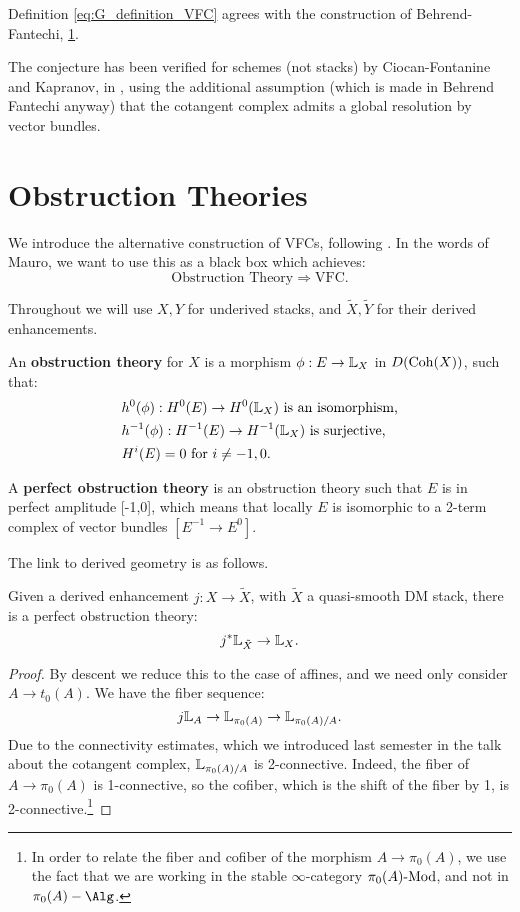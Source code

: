 \begin{conj}
Definition \ref{eq:G_definition_VFC} agrees with the construction of Behrend-Fantechi, \ref{}. 
\end{conj}

The conjecture has been verified for schemes (not stacks) by Ciocan-Fontanine and Kapranov, in
\cite{ciocan_fontanine_kapranov}, using the additional 
assumption (which is made in Behrend Fantechi anyway) that the cotangent complex admits a global resolution by vector bundles.




\section{Obstruction Theories}
We introduce the alternative construction of VFCs, following \cite{Behrend_Intrinsic_normal_cone_1997}. In the words of
Mauro, we want to use this as a black box which achieves:
\[	\text{Obstruction Theory} \Longrightarrow \text{VFC}.	\]

Throughout we will use $X,Y$ for underived stacks, and $\tilde X, \tilde Y$ for their derived enhancements.

\begin{defin}
An \textbf{obstruction theory} for $X$ is a morphism $\phi : E \to \mathbb L_X$ in $D(\mathrm{Coh}(X))$, such that:
\begin{align*}
&h^0(\phi) : H^0(E) \to H^0(\mathbb L_X) \text{ is an isomorphism,} \\
&h^{-1}(\phi) : H^{-1}(E) \to H^{-1}(\mathbb L_X) \text{ is surjective,} \\
&H^i(E) = 0 \text{ for } i \neq -1,0.
\end{align*} 
\end{defin}

\begin{defin}
A \textbf{perfect obstruction theory} is an obstruction theory such that $E$ is in perfect amplitude [-1,0], which means that
locally $E$ is isomorphic to a 2-term complex of vector bundles $[E^{-1} \to E^0]$.
\end{defin}

The link to derived geometry is as follows. 
\begin{prop}
Given a derived enhancement $j:X \to \tilde X$, with $\tilde X$ a quasi-smooth DM stack, there is a perfect obstruction theory:
\[	j^* \mathbb L_{\tilde X} \to \mathbb L_X.	\]
\end{prop}
\begin{proof}
By descent we reduce this to the case of affines, and we need only consider $A \to t_0(A)$. We have the fiber sequence:
\[	j\mathbb L_A \to \mathbb L_{\pi_0(A)} \to \mathbb L_{\pi_0(A)/A}.	\]
Due to the connectivity estimates, which we introduced last semester in the talk about the cotangent complex,
$\mathbb L_{\pi_0(A)/A}$ is 2-connective. Indeed, the fiber of $A \to \pi_0(A)$ is 1-connective,
so the cofiber, which is the shift of the fiber by 1, is 2-connective.\footnote{In order to relate the fiber and cofiber of the
morphism $A \to \pi_0(A)$, we use the fact that we are working in the stable $\infty$-category $\pi_0(A)\textrm{-}\mathrm{Mod}$, and not 
in $\pi_0(A)-\Alg$.}
\end{proof}

